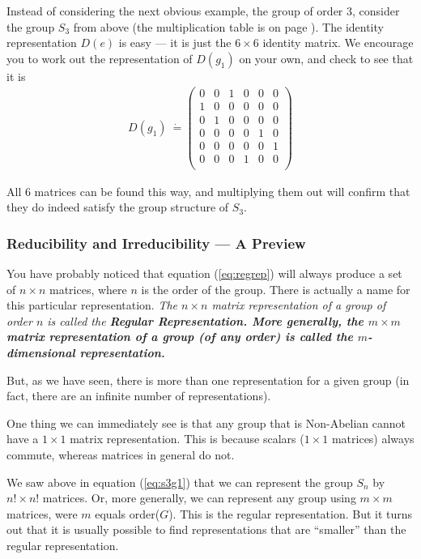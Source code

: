 \documentclass[12pt,epsf]{article}
\begin{document}
Instead of considering the next obvious example, the group of order
3, consider the group $S_3$ from above (the multiplication table is
on page \pageref{s3}).	The identity representation $D(e)$ is easy --- it
is just the $6\times 6$ identity matrix.  We encourage you to work out
the representation of $D(g_1)$ on your own, and check to see that it is
\begin{eqnarray}
D(g_1)~\dot{=}
\begin{pmatrix}
0 & 0 & 1 & 0 & 0 & 0 \\
1 & 0 & 0 & 0 & 0 & 0 \\
0 & 1 & 0 & 0 & 0 & 0 \\
0 & 0 & 0 & 0 & 1 & 0 \\
0 & 0 & 0 & 0 & 0 & 1 \\
0 & 0 & 0 & 1 & 0 & 0 \\
\end{pmatrix} \label{eq:s3g1}
\end{eqnarray}

All 6 matrices can be found this way, and multiplying them out will
confirm that they do indeed satisfy the group structure of $S_3$.  

\subsubsection{Reducibility and Irreducibility --- A Preview}
\label{sec:redprev}

You have probably noticed that equation (\ref{eq:regrep}) will always
produce a set of $n\times n$ matrices, where $n$ is the order of the
group.	There is actually a name for this particular representation. 
\it The $n\times n$ matrix representation of a group of order $n$ is
called the \bf Regular Representation\rm.  More generally, \it the
$m\times  m$ matrix representation of a group (of any order) is called
the \bf {\boldmath$m$}-dimensional representation.  \rm

But, as we have seen, there is more than one representation for a given
group (in fact, there are an infinite number of representations).  

One thing we can immediately see is that any group that is Non-Abelian
cannot have a $1\times 1$ matrix representation.  This is because
scalars ($1\times 1$ matrices) always commute, whereas matrices in
general do not.  

We saw above in equation (\ref{eq:s3g1}) that we can represent the
group $S_n$ by $n!\times n!$ matrices.	Or, more generally, we can
represent any group using $m \times m$ matrices, were $m$ equals order($G$).  This is
the regular representation.  But it turns out that it is usually
possible to find representations that are ``smaller'' than the regular
representation.  
\end{document}
